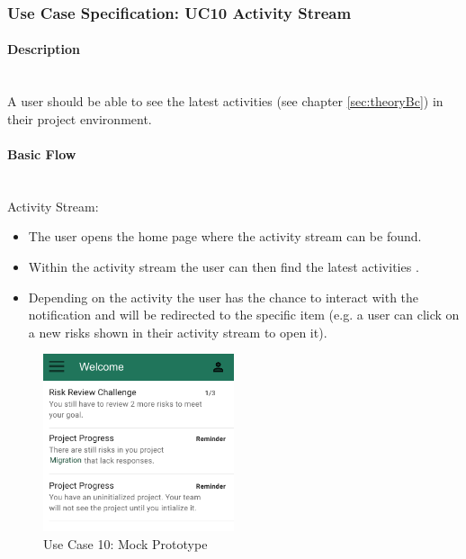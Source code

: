 
\newpage
\subsubsection{Use Case Specification: \ac{UC}10 Activity Stream}
\label{sec:domainBbk}

\paragraph*{Description}\mbox{}\\
A user should be able to see the latest activities (see chapter \ref{sec:theoryBc}) in their project environment.

\paragraph*{Basic Flow} \mbox{}\\
\noindent
Activity Stream: 
\begin{itemize}
	\vspace{-3mm}
	\setlength\itemsep{-1em}
	\item The user opens the home page where the activity stream can be found.
	\item Within the activity stream the user can then find the latest activities .
	\item Depending on the activity the user has the chance to interact with the notification and will be redirected to the specific item (e.g. a user can click on a new risks shown in their activity stream to open it).
\end{itemize} 

\begin{figure}[H]
	\centering
	\includegraphics[width=0.5\textwidth]{Assets/UC_Screenshots/UC10S.png}
	\caption{Use Case 10: Mock Prototype}
	\label{fig:useCase10Detail}
\end{figure}

